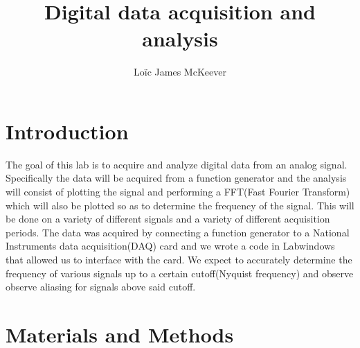 \documentclass{article}
\begin{document}
\title{Digital data acquisition and analysis}
\author{Loïc James McKeever}

\maketitle

\section{Introduction}

The goal of this lab is to acquire and analyze digital data from an analog signal.  Specifically the data will be acquired from a function generator and the analysis will consist of plotting the signal and performing a FFT(Fast Fourier Transform) which will also be plotted so as to determine the frequency of the signal.  This will be done on a variety of different signals and a variety of different acquisition periods.  The data was acquired by connecting a function generator to a National Instruments data acquisition(DAQ) card and we wrote a code in Labwindows that allowed us to interface with the card.  We expect to accurately determine the frequency of various signals up to a certain cutoff(Nyquist frequency) and observe observe aliasing for signals above said cutoff. 

\section{Materials and Methods}
\end{document}
